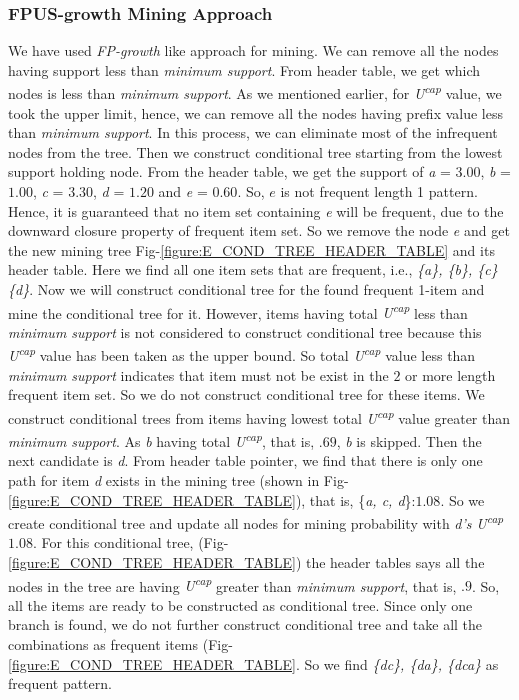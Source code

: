 \documentclass[conference]{IEEEtran}
\begin{document}
\subsubsection{FPUS-growth Mining Approach}
We have used \emph{FP-growth} like approach for mining. We can remove all the nodes having support less than \emph{minimum support}. From header table, we get which nodes is less than \emph{minimum support}. As we mentioned earlier, for \emph{U\textsuperscript{cap}} value, we took the upper limit, hence, we can remove all the nodes having prefix value less than \emph{minimum support}. In this process, we can eliminate most of the infrequent nodes from the tree. Then we construct conditional tree starting from the lowest support holding node.
From the header table, we get the support of \emph{a} = $3.00$, \emph{b} = $1.00$, \emph{c} = $3.30$, \emph{d} = $1.20$ and \emph{e} = $0.60$. So, \emph{$e$} is not frequent length 1 pattern. Hence, it is guaranteed that no item set containing \emph{e} will be frequent, due to the downward closure property of frequent item set. So we remove the node \emph{e} and get the new mining tree Fig-\ref{figure:E_COND_TREE_HEADER_TABLE} and its header table. Here we find all one item sets that are frequent, i.e., \emph{\{a\}, \{b\}, \{c\} \{d\}}. Now we will construct conditional tree for the found frequent 1-item and mine the conditional tree for it. However, items having total \emph{U\textsuperscript{cap}} less than \emph{minimum support} is not considered to construct conditional tree because this \emph{U\textsuperscript{cap}} value has been taken as the upper bound. So total \emph{U\textsuperscript{cap}} value less than \emph{minimum support} indicates that item must not be exist in the $2$ or more length frequent item set. So we do not construct conditional tree for these items.
We construct conditional trees from items having lowest total \emph{U\textsuperscript{cap}} value greater than \emph{minimum support}. As \emph{b} having total \emph{U\textsuperscript{cap}}, that is, $.69$, \emph{b} is skipped. Then the next candidate is \emph{d}. From header table pointer, we find that there is only one path for item \emph{d} exists in the mining tree (shown in Fig-\ref{figure:E_COND_TREE_HEADER_TABLE}), that is, \{\emph{a, c, d}\}:$1.08$. So we create conditional tree and update all nodes for mining probability with \emph{d's} \emph{U\textsuperscript{cap}} $1.08$. For this conditional tree, (Fig-\ref{figure:E_COND_TREE_HEADER_TABLE}) the header tables says all the nodes in the tree are having \emph{U\textsuperscript{cap}} greater than \emph{minimum support}, that is, $.9$. So, all the items are ready to be constructed as conditional tree. Since only one branch is found, we do not further construct conditional tree and take all the combinations as frequent items (Fig-\ref{figure:E_COND_TREE_HEADER_TABLE}. So we find \emph{\{dc\}, \{da\}, \{dca\}} as frequent pattern. 
\end{document}
